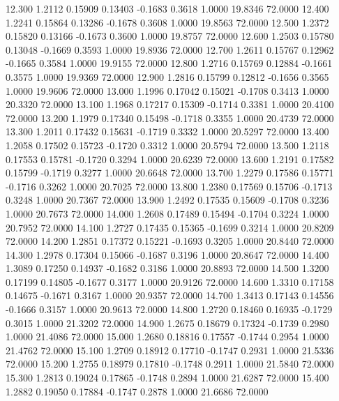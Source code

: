   12.300   1.2112   0.15909   0.13403  -0.1683   0.3618   1.0000  19.8346  72.0000
  12.400   1.2241   0.15864   0.13286  -0.1678   0.3608   1.0000  19.8563  72.0000
  12.500   1.2372   0.15820   0.13166  -0.1673   0.3600   1.0000  19.8757  72.0000
  12.600   1.2503   0.15780   0.13048  -0.1669   0.3593   1.0000  19.8936  72.0000
  12.700   1.2611   0.15767   0.12962  -0.1665   0.3584   1.0000  19.9155  72.0000
  12.800   1.2716   0.15769   0.12884  -0.1661   0.3575   1.0000  19.9369  72.0000
  12.900   1.2816   0.15799   0.12812  -0.1656   0.3565   1.0000  19.9606  72.0000
  13.000   1.1996   0.17042   0.15021  -0.1708   0.3413   1.0000  20.3320  72.0000
  13.100   1.1968   0.17217   0.15309  -0.1714   0.3381   1.0000  20.4100  72.0000
  13.200   1.1979   0.17340   0.15498  -0.1718   0.3355   1.0000  20.4739  72.0000
  13.300   1.2011   0.17432   0.15631  -0.1719   0.3332   1.0000  20.5297  72.0000
  13.400   1.2058   0.17502   0.15723  -0.1720   0.3312   1.0000  20.5794  72.0000
  13.500   1.2118   0.17553   0.15781  -0.1720   0.3294   1.0000  20.6239  72.0000
  13.600   1.2191   0.17582   0.15799  -0.1719   0.3277   1.0000  20.6648  72.0000
  13.700   1.2279   0.17586   0.15771  -0.1716   0.3262   1.0000  20.7025  72.0000
  13.800   1.2380   0.17569   0.15706  -0.1713   0.3248   1.0000  20.7367  72.0000
  13.900   1.2492   0.17535   0.15609  -0.1708   0.3236   1.0000  20.7673  72.0000
  14.000   1.2608   0.17489   0.15494  -0.1704   0.3224   1.0000  20.7952  72.0000
  14.100   1.2727   0.17435   0.15365  -0.1699   0.3214   1.0000  20.8209  72.0000
  14.200   1.2851   0.17372   0.15221  -0.1693   0.3205   1.0000  20.8440  72.0000
  14.300   1.2978   0.17304   0.15066  -0.1687   0.3196   1.0000  20.8647  72.0000
  14.400   1.3089   0.17250   0.14937  -0.1682   0.3186   1.0000  20.8893  72.0000
  14.500   1.3200   0.17199   0.14805  -0.1677   0.3177   1.0000  20.9126  72.0000
  14.600   1.3310   0.17158   0.14675  -0.1671   0.3167   1.0000  20.9357  72.0000
  14.700   1.3413   0.17143   0.14556  -0.1666   0.3157   1.0000  20.9613  72.0000
  14.800   1.2720   0.18460   0.16935  -0.1729   0.3015   1.0000  21.3202  72.0000
  14.900   1.2675   0.18679   0.17324  -0.1739   0.2980   1.0000  21.4086  72.0000
  15.000   1.2680   0.18816   0.17557  -0.1744   0.2954   1.0000  21.4762  72.0000
  15.100   1.2709   0.18912   0.17710  -0.1747   0.2931   1.0000  21.5336  72.0000
  15.200   1.2755   0.18979   0.17810  -0.1748   0.2911   1.0000  21.5840  72.0000
  15.300   1.2813   0.19024   0.17865  -0.1748   0.2894   1.0000  21.6287  72.0000
  15.400   1.2882   0.19050   0.17884  -0.1747   0.2878   1.0000  21.6686  72.0000
